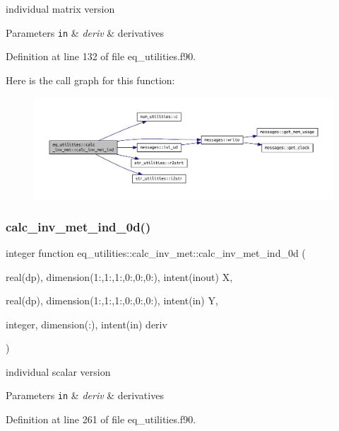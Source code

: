 individual matrix version 


\begin{DoxyParams}[1]{Parameters}
\mbox{\tt in}  & {\em deriv} & derivatives \\
\hline
\end{DoxyParams}


Definition at line 132 of file eq\+\_\+utilities.\+f90.

Here is the call graph for this function\+:\nopagebreak
\begin{figure}[H]
\begin{center}
\leavevmode
\includegraphics[width=350pt]{interfaceeq__utilities_1_1calc__inv__met_a52032d5ed98c02aa25ec4ee8489d3452_cgraph}
\end{center}
\end{figure}
\mbox{\label{interfaceeq__utilities_1_1calc__inv__met_a6d60c210f6a6db200d329b2c5748ef9b}} 
\subsubsection{\texorpdfstring{calc\+\_\+inv\+\_\+met\+\_\+ind\+\_\+0d()}{calc\_inv\_met\_ind\_0d()}}
{\footnotesize\ttfamily integer function eq\+\_\+utilities\+::calc\+\_\+inv\+\_\+met\+::calc\+\_\+inv\+\_\+met\+\_\+ind\+\_\+0d (\begin{DoxyParamCaption}\item[{real(dp), dimension(1\+:,1\+:,1\+:,0\+:,0\+:,0\+:), intent(inout)}]{X,  }\item[{real(dp), dimension(1\+:,1\+:,1\+:,0\+:,0\+:,0\+:), intent(in)}]{Y,  }\item[{integer, dimension(\+:), intent(in)}]{deriv }\end{DoxyParamCaption})}



individual scalar version 


\begin{DoxyParams}[1]{Parameters}
\mbox{\tt in}  & {\em deriv} & derivatives \\
\hline
\end{DoxyParams}


Definition at line 261 of file eq\+\_\+utilities.\+f90.



